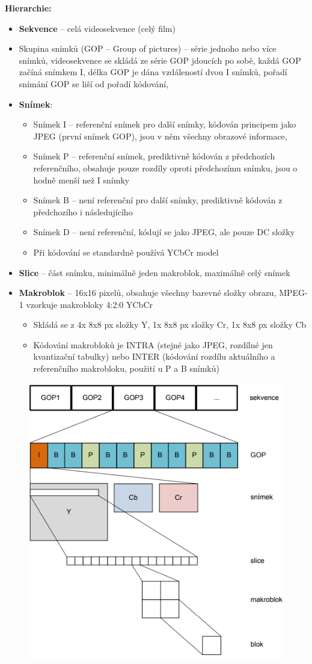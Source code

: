 \textbf{Hierarchie:} \vspace{-4mm}
\begin{itemize}
    \item \textbf{Sekvence} – celá videosekvence (celý film)
 \item Skupina snímků (GOP – Group of pictures) – série jednoho nebo více snímků, videosekvence se skládá ze série GOP
jdoucích po sobě, každá GOP začíná snímkem I, délka GOP je dána vzdáleností dvou I snímků, pořadí snímání GOP
se liší od pořadí kódování,
 \item \textbf{Snímek}:
 \begin{itemize}
     \item Snímek I – referenční snímek pro další snímky, kódován principem jako JPEG (první snímek GOP), jsou v něm
všechny obrazové informace,
\item Snímek P – referenční snímek, prediktivně kódován z předchozích referenčního, obsahuje pouze rozdíly oproti
předchozímu snímku, jsou o hodně menší než I snímky
\item Snímek B – není referenční pro další snímky, prediktivně kódován z předchozího i následujícího
\item Snímek D – není referenční, kódují se jako JPEG, ale pouze DC složky
\item Při kódování se standardně používá YCbCr model
 \end{itemize}
 \item \textbf{Slice} – část snímku, minimálně jeden makroblok, maximálně celý snímek
 \item \textbf{Makroblok} – 16x16 pixelů, obsahuje všechny barevné složky obrazu, MPEG-1 vzorkuje makrobloky 4:2:0 YCbCr
 \begin{itemize}
     \item Skládá se z 4x 8x8 px složky Y, 1x 8x8 px složky Cr, 1x 8x8 px složky Cb
\item Kódování makrobloků je INTRA (stejné jako JPEG, rozdílné jen kvantizační tabulky) nebo INTER (kódování rozdílu
aktuálního a referenčního makrobloku, použití u P a B snímků)
 \end{itemize}
\end{itemize}

\begin{figure}[ht]
    \centering
    \includegraphics[width=0.5\linewidth]{MPC-ZMD//images/mpeg.png}
\end{figure}
\FloatBarrier

